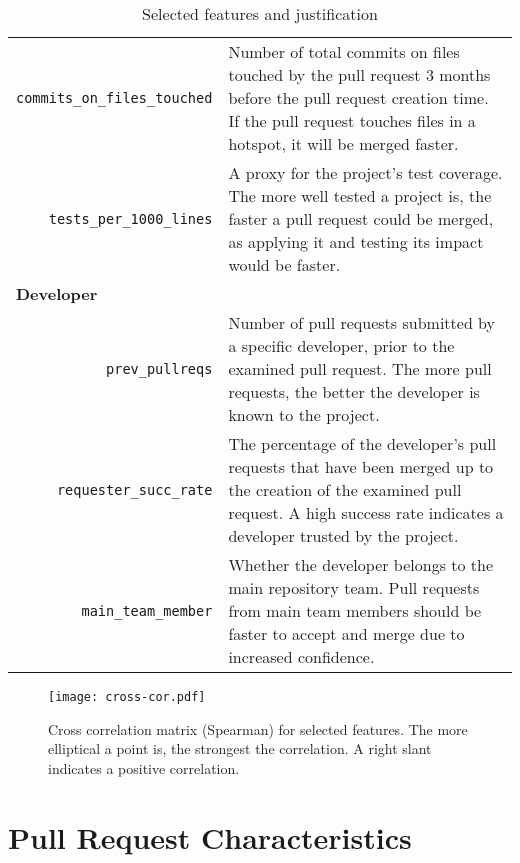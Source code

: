 \documentclass{sig-alternate}
\begin{document}
\begin{table*}
\begin{small}
\begin{tabular}{rp{40em}}
    \texttt{commits\_on\_files\_touched} & Number of total commits on files
    touched by the pull request 3 months before the pull request creation time.
    If the pull request touches files in a hotspot, it will be merged faster.\\
 
    \texttt{tests\_per\_1000\_lines} & A proxy for the project's test
    coverage. The more well tested a project is, the faster a pull request
    could be merged, as applying it and testing its impact would be faster. \\

    \multicolumn{2}{l}{\bf{Developer}}\\
    
    \texttt{prev\_pullreqs} & Number of pull requests submitted by a specific
    developer, prior to the examined pull request. The more pull requests, the
    better the developer is known to the project.\\

    \texttt{requester\_succ\_rate} & The percentage of the developer's pull requests that have been merged up to the creation of the examined pull
    request. A high success rate indicates a developer trusted by the project.\\

    \texttt{main\_team\_member} & Whether the developer belongs to the
    main repository team. Pull requests from main team members should be
    faster to accept and merge due to increased confidence.\\
    \hline
  \end{tabular}
  \caption{Selected features and justification}
  \label{tab:features}
  \end{small}
\end{table*}


\begin{figure}
  \begin{center}
    \texttt{[image: cross-cor.pdf]}
  \end{center}
  \caption{Cross correlation matrix (Spearman) for selected features. The more elliptical a point is, the strongest the correlation. A right slant indicates
  a positive correlation.}
  \label{fig:crosscor}
\end{figure}

\section{Pull Request Characteristics}
\end{document}
